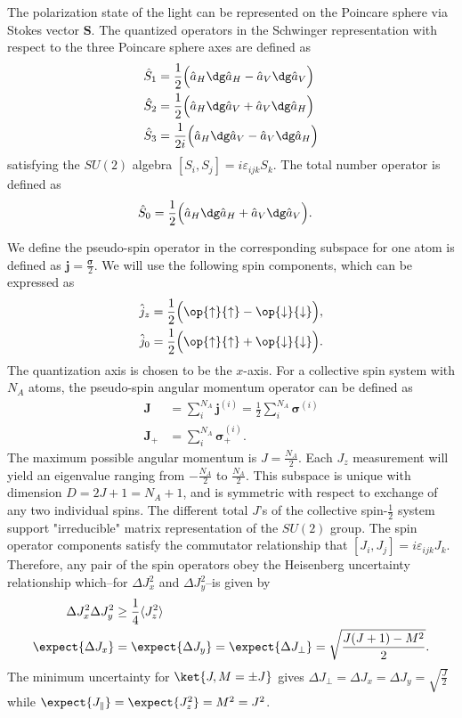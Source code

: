 \documentclass[]{report}
\begin{document}
The polarization state of the light can be represented on the Poincare sphere via Stokes vector $ \mathbf{S} $. The quantized operators in the Schwinger representation with respect to the three Poincare sphere axes are defined as  
\begin{align}
\hat{S}_1&= \frac{1}{2} \Big( \hat{a}_H\dg \hat{a}_H -  \hat{a}_V\dg \hat{a}_V \Big) \\
\hat{S}_2&= \frac{1}{2} \Big( \hat{a}_H\dg \hat{a}_V +  \hat{a}_V\dg \hat{a}_H \Big)\\
\hat{S}_3&= \frac{1}{2i} \Big( \hat{a}_H\dg \hat{a}_V -  \hat{a}_V\dg \hat{a}_H \Big)
\end{align}
satisfying the $ SU(2) $ algebra $ [S_i,S_j]=i\varepsilon_{ijk}S_k $. The total number operator is defined as
\begin{align}
\hat{S}_0&= \frac{1}{2} \Big( \hat{a}_H\dg \hat{a}_H +  \hat{a}_V\dg \hat{a}_V \Big).
\end{align}

We define the pseudo-spin operator in the corresponding subspace for one atom is defined as $ \mathbf{j}=\frac{\boldsymbol{\sigma}}{2} $. We will use  the following spin components, which can be expressed as
\begin{align}
\hat{j}_z &= \frac{1}{2} \Big( \op{\uparrow}{\uparrow} - \op{\downarrow}{\downarrow}  \Big), \\
\hat{j}_0 &= \frac{1}{2} \Big( \op{\uparrow}{\uparrow} + \op{\downarrow}{\downarrow}  \Big).
\end{align}
The quantization axis is chosen to be the $ x $-axis. For a collective spin system with $ N_A $ atoms, the pseudo-spin angular momentum operator can be defined as
\begin{align}
\mathbf{J} &=\sum_i^{N_A}\mathbf{j}^{(i)}=\frac{1}{2}\sum_i^{N_A} \boldsymbol{\sigma}^{(i)}\\
\mathbf{J}_+ &=\sum_i^{N_A} \boldsymbol{\sigma}^{(i)}_+.
\end{align}
The maximum possible angular momentum is $ J=\frac{N_A}{2} $. Each $ J_z $ measurement will yield an eigenvalue ranging from $ -\frac{N_A}{2} $ to $ \frac{N_A}{2} $.  This subspace is unique with dimension $ D=2J+1=N_A+1 $, and is symmetric with respect to exchange of any two individual spins. The different total $ J $'s of the collective spin-$ \frac{1}{2} $ system support "irreducible" matrix representation of the $ SU(2) $ group. The spin operator components satisfy the commutator relationship that $ [J_i,J_j]=i\varepsilon_{ijk}J_k $. Therefore, any pair of the spin operators obey the Heisenberg uncertainty relationship which--for $ \Delta J_x^2 $ and $ \Delta J_y^2 $--is given by 
\begin{align}
\Delta J_x^2\Delta J_y^2 &\ge \frac{1}{4}\langle J_z^2\rangle \\
\expect{\Delta J_x} &=\expect{\Delta J_y}=\expect{\Delta J_{\perp}}=\sqrt{\frac{J(J+1)-M^2}{2}}.
\end{align}
The minimum uncertainty for $ \ket{J,M=\pm J} $ gives $ \Delta J_\perp=\Delta J_x=\Delta J_y = \sqrt{\frac{J}{2}} $ while $ \expect{J_\parallel}=\expect{J_z^2}=M^2=J^2 $. 
\end{document}
